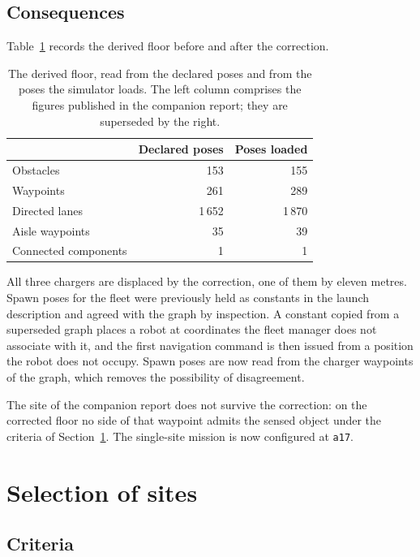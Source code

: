 \documentclass[11pt,a4paper]{article}
\theoremstyle{definition}
\newcommand{\code}[1]{\texttt{\small #1}}
\newcommand{\site}[1]{\code{#1}}
\begin{document}
\subsection{Consequences}

Table~\ref{tab:floor} records the derived floor before and after the
correction.

\begin{table}[H]
\centering\small
\caption{The derived floor, read from the declared poses and from the poses the
simulator loads. The left column comprises the figures published in the
companion report; they are superseded by the right.}
\label{tab:floor}
\begin{tabular}{@{}lrr@{}}
\toprule
 & \textbf{Declared poses} & \textbf{Poses loaded} \\
\midrule
Obstacles                & 153    & 155    \\
Waypoints                & 261    & 289    \\
Directed lanes           & 1\,652 & 1\,870 \\
Aisle waypoints          & 35     & 39     \\
Connected components     & 1      & 1      \\
\bottomrule
\end{tabular}
\end{table}

All three chargers are displaced by the correction, one of them by eleven
metres. Spawn poses for the fleet were previously held as constants in the
launch description and agreed with the graph by inspection. A constant copied
from a superseded graph places a robot at coordinates the fleet manager does
not associate with it, and the first navigation command is then issued from a
position the robot does not occupy. Spawn poses are now read from the charger
waypoints of the graph, which removes the possibility of disagreement.

The site of the companion report does not survive the correction: on the
corrected floor no side of that waypoint admits the sensed object under the
criteria of Section~\ref{sec:sites}. The single-site mission is now configured
at \site{a17}.

\section{Selection of sites}
\label{sec:sites}

\subsection{Criteria}
\label{sec:sitecriteria}
\end{document}
